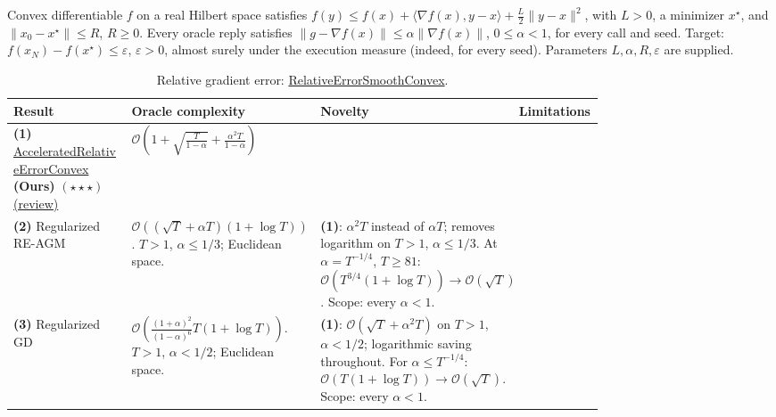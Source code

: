\begin{table}[tp]
\centering
\caption{Relative gradient error: \href{https://github.com/k3nfalt/longtails/blob/main/LongTails/Setups/RelativeErrorSmoothConvex.lean}{RelativeErrorSmoothConvex}.}\label{tab:RelativeErrorSmoothConvex}
\parbox{\linewidth}{\footnotesize Convex differentiable $f$ on a real Hilbert space satisfies $f(y)\le f(x)+\langle\nabla f(x),y-x\rangle+\frac L2\|y-x\|^2$, with $L>0$, a minimizer $x^\star$, and $\|x_0-x^\star\|\le R$, $R\ge0$. Every oracle reply satisfies $\|g-\nabla f(x)\|\le\alpha\|\nabla f(x)\|$, $0\le\alpha<1$, for every call and seed. Target: $f(x_N)-f(x^\star)\le\varepsilon$, $\varepsilon>0$, almost surely under the execution measure (indeed, for every seed). Parameters $L,\alpha,R,\varepsilon$ are supplied.}\par\smallskip
\begin{threeparttable}
\footnotesize
\setlength{\tabcolsep}{4pt}\renewcommand{\arraystretch}{1.25}
\begin{tabularx}{\linewidth}{@{}>{\raggedright\arraybackslash}p{0.20\linewidth}>{\raggedright\arraybackslash}p{0.32\linewidth}>{\raggedright\arraybackslash}p{0.25\linewidth}>{\raggedright\arraybackslash}X@{}}
\toprule
\textbf{Result} & \textbf{Oracle complexity} & \textbf{Novelty} & \textbf{Limitations} \\
\midrule
\textbf{(1)} \href{https://github.com/k3nfalt/longtails/blob/main/LongTails/Theorems/AcceleratedRelativeErrorConvex.lean}{Accelerated\allowbreak Relative\allowbreak Error\allowbreak Convex} \textbf{(Ours)} $(\star\star\star)$ \href{https://github.com/k3nfalt/longtails/blob/main/scripts/reviews/AcceleratedRelativeErrorConvex.md}{(review)}
& $\mathcal{O}\!\left(1+\sqrt{\frac{T}{1-\alpha}}+\frac{\alpha^2T}{1-\alpha}\right)$ & & \\
\midrule[1.2pt]
\textbf{(2)} Regularized RE-AGM \citep[Thm.~7.2]{igsVasinGasnikov2026v1}
& $\mathcal{O}\!\left((\sqrt T+\alpha T)(1+\log T)\right)$.
$T>1$, $\alpha\le1/3$; Euclidean space.
& \textbf{(1)}: $\alpha^2T$ instead of $\alpha T$; removes logarithm on $T>1$, $\alpha\le1/3$. At $\alpha=T^{-1/4}$, $T\ge81$: $\mathcal{O}(T^{3/4}(1+\log T))\to\mathcal{O}(\sqrt T)$. Scope: every $\alpha<1$.
& \\
\midrule
\textbf{(3)} Regularized GD \citep[Thm.~7.1]{igsVasinGasnikov2026v1}
& $\mathcal{O}\!\left(\frac{(1+\alpha)^2}{(1-\alpha)^6}T(1+\log T)\right)$.
$T>1$, $\alpha<1/2$; Euclidean space.
& \textbf{(1)}: $\mathcal{O}(\sqrt T+\alpha^2T)$ on $T>1$, $\alpha<1/2$; logarithmic saving throughout. For $\alpha\le T^{-1/4}$: $\mathcal{O}(T(1+\log T))\to\mathcal{O}(\sqrt T)$. Scope: every $\alpha<1$.

\end{tabularx}
\end{threeparttable}
\end{table}

